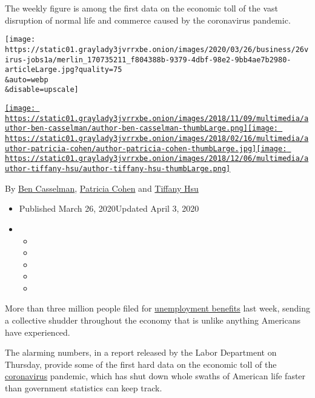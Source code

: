 The weekly figure is among the first data on the economic toll of the
vast disruption of normal life and commerce caused by the coronavirus
pandemic.

\texttt{[image: https://static01.graylady3jvrrxbe.onion/images/2020/03/26/business/26virus-jobs1a/merlin\_170735211\_f804388b-9379-4dbf-98e2-9bb4ae7b2980-articleLarge.jpg?quality=75\\\&auto=webp\\\&disable=upscale]}

\href{https://www.nytimes3xbfgragh.onion/by/ben-casselman}{\texttt{[image: https://static01.graylady3jvrrxbe.onion/images/2018/11/09/multimedia/author-ben-casselman/author-ben-casselman-thumbLarge.png]}}\href{https://www.nytimes3xbfgragh.onion/by/patricia-cohen}{\texttt{[image: https://static01.graylady3jvrrxbe.onion/images/2018/02/16/multimedia/author-patricia-cohen/author-patricia-cohen-thumbLarge.jpg]}}\href{https://www.nytimes3xbfgragh.onion/by/tiffany-hsu}{\texttt{[image: https://static01.graylady3jvrrxbe.onion/images/2018/12/06/multimedia/author-tiffany-hsu/author-tiffany-hsu-thumbLarge.png]}}

By \href{https://www.nytimes3xbfgragh.onion/by/ben-casselman}{Ben
Casselman},
\href{https://www.nytimes3xbfgragh.onion/by/patricia-cohen}{Patricia
Cohen} and
\href{https://www.nytimes3xbfgragh.onion/by/tiffany-hsu}{Tiffany Hsu}

\begin{itemize}
\item
  Published March 26, 2020Updated April 3, 2020
\item
  \begin{itemize}
  \item
  \item
  \item
  \item
  \item
  \end{itemize}
\end{itemize}

More than three million people filed for
\href{https://www.nytimes3xbfgragh.onion/2020/04/03/upshot/coronavirus-jobless-rate-great-depression.html}{unemployment
benefits} last week, sending a collective shudder throughout the economy
that is unlike anything Americans have experienced.

The alarming numbers, in a report released by the Labor Department on
Thursday, provide some of the first hard data on the economic toll of
the
\href{https://www.nytimes3xbfgragh.onion/2020/04/03/upshot/coronavirus-jobless-rate-great-depression.html}{coronavirus}
pandemic, which has shut down whole swaths of American life faster than
government statistics can keep track.

